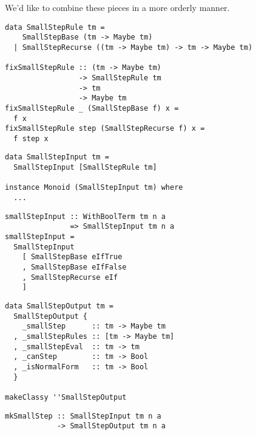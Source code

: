 \documentclass{beamer}
\begin{document}
\begin{frame}[c]
  \begin{center}
   We'd like to combine these pieces in a more orderly manner.
  \end{center}
\end{frame}

\begin{frame}[fragile]
  \begin{verbatim}
data SmallStepRule tm =
    SmallStepBase (tm -> Maybe tm)
  | SmallStepRecurse ((tm -> Maybe tm) -> tm -> Maybe tm)

fixSmallStepRule :: (tm -> Maybe tm)
                 -> SmallStepRule tm
                 -> tm
                 -> Maybe tm
fixSmallStepRule _ (SmallStepBase f) x =
  f x
fixSmallStepRule step (SmallStepRecurse f) x =
  f step x
  \end{verbatim}
\end{frame} 

\begin{frame}[fragile]
  \begin{verbatim}
data SmallStepInput tm =
  SmallStepInput [SmallStepRule tm]

instance Monoid (SmallStepInput tm) where
  ...
  \end{verbatim}
\end{frame} 

\begin{frame}[fragile]
  \begin{verbatim}
smallStepInput :: WithBoolTerm tm n a
               => SmallStepInput tm n a
smallStepInput =
  SmallStepInput
    [ SmallStepBase eIfTrue
    , SmallStepBase eIfFalse
    , SmallStepRecurse eIf
    ]
  \end{verbatim}
\end{frame} 

\begin{frame}[fragile]
  \begin{verbatim}
data SmallStepOutput tm =
  SmallStepOutput {
    _smallStep      :: tm -> Maybe tm
  , _smallStepRules :: [tm -> Maybe tm]
  , _smallStepEval  :: tm -> tm
  , _canStep        :: tm -> Bool
  , _isNormalForm   :: tm -> Bool
  }

makeClassy ''SmallStepOutput
  \end{verbatim}
\end{frame} 

\begin{frame}[fragile]
  \begin{verbatim}
mkSmallStep :: SmallStepInput tm n a
            -> SmallStepOutput tm n a
  \end{verbatim}
\end{frame} 
\end{document}
